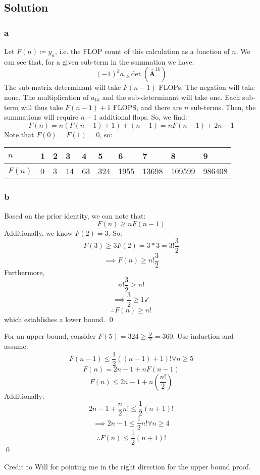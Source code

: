 \documentclass[11pt]{report}
\theoremstyle{definition}
\newcommand{\mat}[1]{\mathbf{#1}}
\begin{document}
\subsection*{Solution}
\subsubsection*{a}
Let $F(n)\coloneqq y_n$, i.e. the FLOP count of this calculation as a function
of $n$.  We can see that, for a given sub-term in the summation we have:
\[(-1)^ka_{1k}\det(\widehat{\mat{A}}^{1k})\]
The sub-matrix determinant will take $F(n-1)$ FLOPs. The negation will take
none. The multiplication of $a_{1k}$ and the sub-determinant will take one.
Each sub-term will thus take $F(n-1)+1$ FLOPS, and there are $n$ sub-terms.
Then, the summations will require $n-1$ additional flops. So, we find:
\[F(n) = n(F(n-1)+1)+(n-1) = nF(n-1)+2n-1\]
Note that $F(0)= F(1) = 0$, so:
\begin{table}[h]
	\begin{center}

		\begin{tabular}{l|lllllllll}
			$n$    & 1 & 2 & 3  & 4  & 5   & 6    & 7     & 8      & 9      \\ \hline
			$F(n)$ & 0 & 3 & 14 & 63 & 324 & 1955 & 13698 & 109599 & 986408
		\end{tabular}
	\end{center}
\end{table}

\subsubsection*{b}
Based on the prior identity, we can note that:
\[F(n)\geq nF(n-1)\]
Additionally, we know $F(2)=3$. So:
\[ F(3) \geq 3F(2) = 3*3 = 3!\frac{3}{2}\]
\[\implies F(n)\geq n!\frac{3}{2}\]
Furthermore,
\[n!\frac{3}{2}\geq n!\]
\[\implies \frac{3}{2}\geq 1\checkmark\]
\[\therefore F(n)\geq n!\]
which establishes a lower bound.
\qed

For an upper bound, consider $F(5)=324 \geq \frac{5!}{2}=360$. Use induction and
assume:
\[F(n-1) \leq \frac{1}{2}((n-1)+1)!\forall n\geq5\]
\[F(n)=2n-1+nF(n-1)\]
\[F(n)\leq 2n-1+n(\frac{n!}{2})\]
Additionally:
\[2n-1+\frac{n}{2}n!\leq \frac{1}{2}(n+1)!\]
\[\implies 2n-1\leq \frac{1}{2}n!\forall n\geq 4\]
\[\therefore F(n)\leq\frac{1}{2}(n+1)!\]
\qed

Credit to Will for pointing me in the right direction for the upper bound proof.
\end{document}
